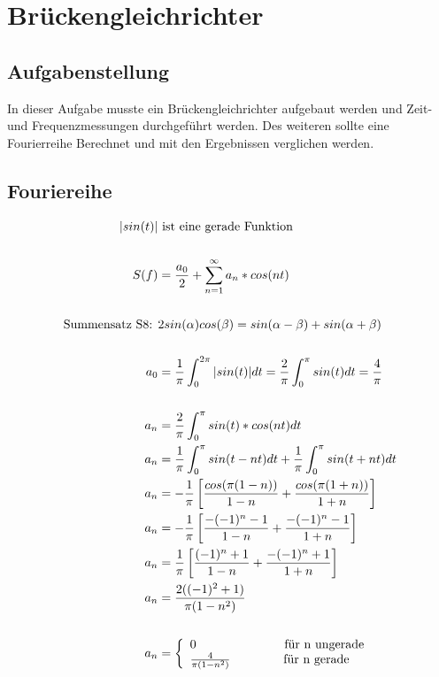 \section{Br\"uckengleichrichter}
\subsection{Aufgabenstellung}
In dieser Aufgabe musste ein Br\"uckengleichrichter aufgebaut werden und Zeit- und Frequenzmessungen durchgef\"uhrt werden. Des weiteren sollte eine Fourierreihe Berechnet und mit den Ergebnissen verglichen werden.

\subsection{Fouriereihe}
\begin{center}
  \begin{align*}
    |sin(t)| & \text{ ist eine gerade Funktion} \\ \\
    S(f) &= \frac{a_0}{2} + \sum_{n=1}^{\infty} a_n * cos(nt) \\ \\
    \text{Summensatz S8: } & 2sin(\alpha)cos(\beta) = sin(\alpha-\beta)+sin(\alpha+\beta) \\ \\
    a_0 &= \frac{1}{\pi}\int_0^{2\pi} |sin(t)| dt = \frac{2}{\pi}\int_0^{\pi} sin(t) dt = \frac{4}{\pi} \\ \\
    a_n &= \frac{2}{\pi}\int_0^{\pi} sin(t) * cos (nt) dt \\
    a_n &= \frac{1}{\pi}\int_0^{\pi} sin(t - nt) dt +  \frac{1}{\pi}\int_0^{\pi} sin(t + nt) dt\\
    a_n &= -\frac{1}{\pi} \left[ \frac{cos(\pi(1-n))}{1-n} + \frac{cos(\pi(1+n))}{1+n} \right] \\
    a_n &= -\frac{1}{\pi} \left[ \frac{-(-1)^n-1}{1-n} + \frac{-(-1)^n-1}{1+n} \right] \\
    a_n &= \frac{1}{\pi} \left[ \frac{(-1)^n+1}{1-n} + \frac{-(-1)^n+1}{1+n} \right] \\
    a_n &= \frac{2((-1)^2+1)}{\pi(1-n^2)} \\ \\
    a_n &= \left\{\begin{array}{ll}
            0                     \hspace{2.5cm} \text{f\"ur n ungerade}\\
            \frac{4}{\pi(1-n^2)} \hspace{1.5cm} \text{f\"ur n gerade}
            \end{array}\right.
  \end{align*}
\end{center}
